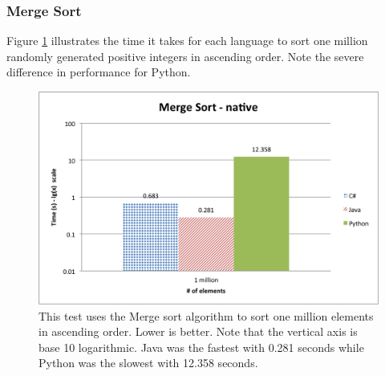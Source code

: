 \subsubsection{Merge Sort}

Figure \ref{fig:native_merge_sort} illustrates the time it takes for each language to sort one million randomly generated positive integers in ascending order. Note the severe difference in performance for Python.

\begin{figure}[h]
	\centering
	\includegraphics[width=1.0\linewidth]{chapters/new_media/MergeSortNative.png}
	\caption{This test uses the Merge sort algorithm to sort one million elements in ascending order. Lower is better. Note that the vertical axis is base 10 logarithmic. Java was the fastest with 0.281 seconds while Python was the slowest with 12.358 seconds.}
	\label{fig:native_merge_sort}
\end{figure}
